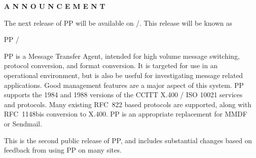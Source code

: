 \begin{center}
\Large \bf A N N O U N C E M E N T
\end{center}

The next release of PP will be available on \ppdate/.
This release will be known as
\begin{center}
PP \ppversion/
\end{center}

PP is a Message Transfer Agent, intended for high volume message
switching, protocol conversion, and format conversion.  It is targeted
for use in an operational environment, but is also be useful for
investigating message related applications.  Good management features
are a major aspect of this system.  PP supports the 1984 and 1988
versions of the CCITT X.400 / ISO 10021 services and protocols.  Many
existing RFC~822 based protocols are supported, along with RFC~1148bis
conversion to X.400.  PP is an appropriate replacement for MMDF or
Sendmail.

This is the second public release of PP, and includes substantial
changes based on feedback from using PP on many sites.

